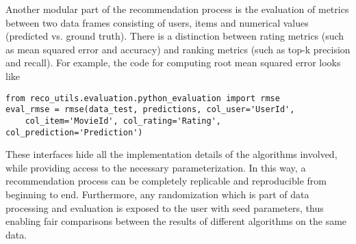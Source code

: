 Another modular part of the recommendation process is the evaluation of metrics between two data frames consisting of users, items and numerical values 
(predicted vs. ground truth). There is a distinction between rating metrics (such as mean squared error and accuracy) and ranking metrics 
(such as top-k precision and recall). For example, the code for computing root mean squared error looks like
\begin{verbatim}
from reco_utils.evaluation.python_evaluation import rmse
eval_rmse = rmse(data_test, predictions, col_user='UserId', 
    col_item='MovieId', col_rating='Rating', col_prediction='Prediction')
\end{verbatim}
 
These interfaces hide all the implementation details of the algorithms involved, while providing access to the necessary parameterization.
In this way, a recommendation process can be completely replicable and reproducible from beginning to end. Furthermore, any randomization 
which is part of data processing and evaluation is exposed to the user with seed parameters, thus enabling fair comparisons between the results of different algorithms
on the same data. 

